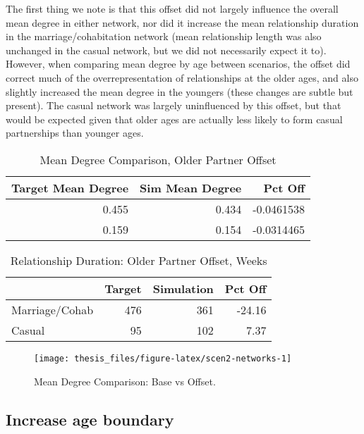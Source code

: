 \documentclass [11pt, proquest] {uwthesis}[2015/03/03]
\begin{document}
The first thing we note is that this offset did not largely influence
the overall mean degree in either network, nor did it increase the mean
relationship duration in the marriage/cohabitation network (mean
relationship length was also unchanged in the casual network, but we did
not necessarily expect it to). However, when comparing mean degree by
age between scenarios, the offset did correct much of the
overrepresentation of relationships at the older ages, and also slightly
increased the mean degree in the youngers (these changes are subtle but
present). The casual network was largely uninfluenced by this offset,
but that would be expected given that older ages are actually less
likely to form casual partnerships than younger ages.
\begin{table}

\caption{\label{tab:scen2-tab}Mean Degree Comparison, Older Partner Offset}
\centering
\begin{tabular}[t]{rrr}
\toprule
Target Mean Degree & Sim Mean Degree & Pct Off\\
\midrule
0.455 & 0.434 & -0.0461538\\
0.159 & 0.154 & -0.0314465\\
\bottomrule
\end{tabular}
\end{table}
\begin{table}

\caption{\label{tab:scen2-duration}Relationship Duration: Older Partner Offset, Weeks}
\centering
\begin{tabular}[t]{lrrr}
\toprule
  & Target & Simulation & Pct Off\\
\midrule
Marriage/Cohab & 476 & 361 & -24.16\\
Casual & 95 & 102 & 7.37\\
\bottomrule
\end{tabular}
\end{table}
\begin{figure}

{\centering \texttt{[image: thesis\_files/figure-latex/scen2-networks-1]} 

}

\caption{Mean Degree Comparison: Base vs Offset.}\label{fig:scen2-networks}
\end{figure}
\subsection{Increase age boundary}\label{increase-age-boundary}
\end{document}
